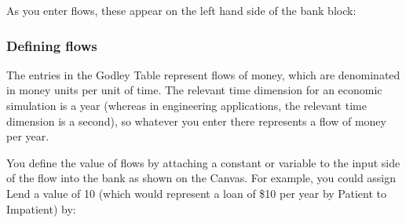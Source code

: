 As you enter flows, these appear on the left hand side of the bank block:

\begin{center}
\end{center}

\subsubsection{Defining flows}

The entries in the Godley Table represent flows of money, which are
denominated in money units per unit of time. The relevant time
dimension for an economic simulation is a year (whereas in engineering
applications, the relevant time dimension is a second), so whatever
you enter there represents a flow of money per year.


You define the value of flows by attaching a constant or variable to
the input side of the flow into the bank as shown on the Canvas. For
example, you could assign Lend a value of 10 (which would represent a
loan of \$10 per year by Patient to Impatient) by:



